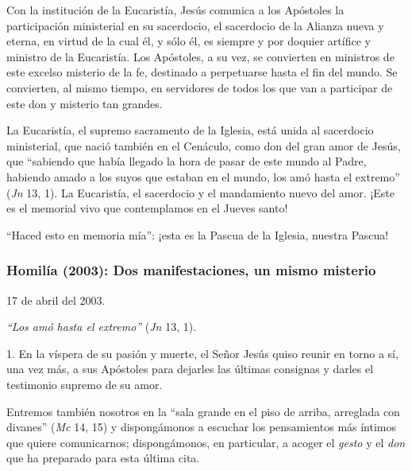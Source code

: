 			\begin{body}Con la institución de la Eucaristía, Jesús comunica a los Apóstoles la participación ministerial en su sacerdocio, el sacerdocio de la Alianza nueva y eterna, en virtud de la cual él, y sólo él, es siempre y por doquier artífice y ministro de la Eucaristía. Los Apóstoles, a su vez, se convierten en ministros de este excelso misterio de la fe, destinado a perpetuarse hasta el fin del mundo. Se convierten, al mismo tiempo, en servidores de todos los que van a participar de este don y misterio tan grandes.\end{body}
			
			\begin{body}La Eucaristía, el supremo sacramento de la Iglesia, está unida al sacerdocio ministerial, que nació también en el Cenáculo, como don del gran amor de Jesús, que “sabiendo que había llegado la hora de pasar de este mundo al Padre, habiendo amado a los suyos que estaban en el mundo, los amó hasta el extremo” (\textit{Jn} 13, 1). La Eucaristía, el sacerdocio y el mandamiento nuevo del amor. ¡Este es el memorial vivo que contemplamos en el Jueves santo!\end{body}
			
			\begin{body}“Haced esto en memoria mía”: ¡esta es la Pascua de la Iglesia, nuestra Pascua!\end{body}
			
			\subsubsection{Homilía (2003): Dos manifestaciones, un mismo misterio}
			
			\begin{referencia}17 de abril del 2003.\end{referencia}
			
			\begin{body}\textit{“Los amó hasta el extremo”} (\textit{Jn} 13, 1).\end{body}
			
			\begin{body}1. En la víspera de su pasión y muerte, el Señor Jesús quiso reunir en torno a sí, una vez más, a sus Apóstoles para dejarles las últimas consignas y darles el testimonio supremo de su amor.\end{body}
			
			\begin{body}Entremos también nosotros en la “sala grande en el piso de arriba, arreglada con divanes” (\textit{Mc }14, 15) y dispongámonos a escuchar los pensamientos más íntimos que quiere comunicarnos; dispongámonos, en particular, a acoger el \textit{gesto} y el \textit{don} que ha preparado para esta última cita.\end{body}
			
